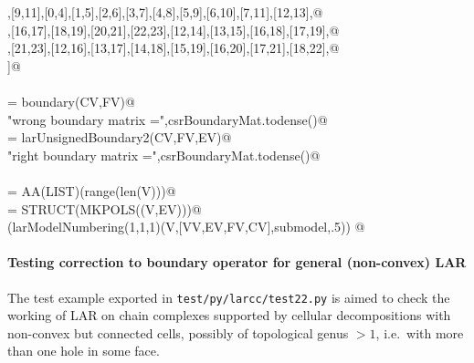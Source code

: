\documentclass[11pt,oneside]{article}    %
\begin{document}
\begin{flushleft}
\begin{list}{}{}
\mbox{}\verb@[8,10],[9,11],[0,4],[1,5],[2,6],[3,7],[4,8],[5,9],[6,10],[7,11],[12,13],@\\
\mbox{}\verb@[14,15],[16,17],[18,19],[20,21],[22,23],[12,14],[13,15],[16,18],[17,19],@\\
\mbox{}\verb@[20,22],[21,23],[12,16],[13,17],[14,18],[15,19],[16,20],[17,21],[18,22],@\\
\mbox{}\verb@[19,23]]@\\
\mbox{}\verb@@\\
\mbox{}\verb@csrBoundaryMat = boundary(CV,FV)@\\
\mbox{}\verb@print "wrong boundary matrix =",csrBoundaryMat.todense()@\\
\mbox{}\verb@csrBoundaryMat = larUnsignedBoundary2(CV,FV,EV)@\\
\mbox{}\verb@print "right boundary matrix =",csrBoundaryMat.todense()@\\
\mbox{}\verb@@\\
\mbox{}\verb@VV = AA(LIST)(range(len(V)))@\\
\mbox{}\verb@submodel = STRUCT(MKPOLS((V,EV)))@\\
\mbox{}\verb@VIEW(larModelNumbering(1,1,1)(V,[VV,EV,FV,CV],submodel,.5)) @\\
\mbox{}\verb@@{\NWsep}
\end{list}
\vspace{-2ex}
\end{flushleft}


\paragraph{Testing correction to boundary operator for general (non-convex) LAR}

The test example exported in \texttt{test/py/larcc/test22.py} is aimed to check the working of LAR on chain complexes supported by cellular decompositions with non-convex but connected cells, possibly of topological genus $>1$, i.e.~with more than one hole in some face.
\end{document}
